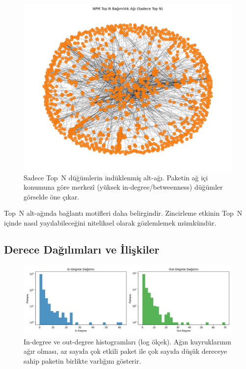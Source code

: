 \documentclass[11pt,a4paper]{article}
\begin{document}
\begin{figure}[H]
  \centering
  \includegraphics{network_topN_only.png}
  \caption{Sadece Top~N düğümlerin indüklenmiş alt-ağı. Paketin ağ içi konumuna göre merkezî (yüksek in-degree/betweenness) düğümler görselde öne çıkar.}
\end{figure}

\noindent Top~N alt-ağında bağlantı motifleri daha belirgindir. Zincirleme etkinin Top~N içinde nasıl yayılabileceğini niteliksel olarak gözlemlemek mümkündür.

\subsection{Derece Dağılımları ve İlişkiler}
\begin{figure}[H]
  \centering
  \includegraphics{degree_histograms.png}
  \caption{In-degree ve out-degree histogramları (log ölçek). Ağın kuyruklarının ağır olması, az sayıda çok etkili paket ile çok sayıda düşük dereceye sahip paketin birlikte varlığını gösterir.}
\end{figure}
\end{document}
